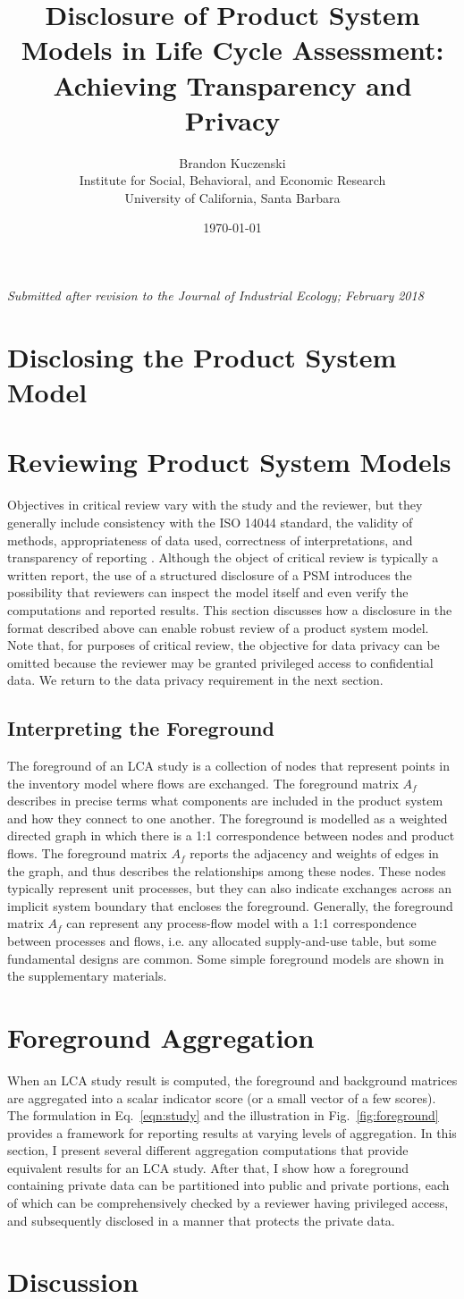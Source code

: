 \documentclass[12pt]{article}
\title{Disclosure of Product System Models in Life Cycle Assessment: Achieving Transparency and Privacy}
\author{Brandon Kuczenski\\
Institute for Social, Behavioral, and Economic Research\\
University of California, Santa Barbara}
\date{\mydate\today}
\def\mainpaper{

  \maketitle
  \emph{Submitted after revision to the Journal of Industrial Ecology; February 2018}

  

  \doublespacing


  
\section{Disclosing the Product System Model}

  
  


\section{Reviewing Product System Models}

Objectives in critical review vary with the study and the reviewer, but they generally include consistency with the ISO 14044 standard, the validity of methods, appropriateness of data used, correctness of interpretations, and transparency of reporting \citep[Section 6.1]{iso14044}.  Although the object of critical review is typically a written report, the use of a structured disclosure of a PSM introduces the possibility that reviewers can inspect the model itself and even verify the computations and reported results.  This section discusses how a disclosure in the format described above can enable robust review of a product system model.  Note that, for purposes of critical review, the objective for data privacy can be omitted because the reviewer may be granted privileged access to confidential data.  We return to the data privacy requirement in the next section.

\subsection{Interpreting the Foreground}

The foreground of an LCA study is a collection of nodes that represent points in the inventory model where flows are exchanged.  The foreground matrix $A_f$ describes in precise terms what components are included in the product system and how they connect to one another.  The foreground is modelled as a weighted directed graph in which there is a 1:1 correspondence between nodes and product flows.  The foreground matrix $A_f$ reports the adjacency and weights of edges in the graph, and thus describes the relationships among these nodes.  These nodes typically represent unit processes, but they can also indicate exchanges across an implicit system boundary that encloses the foreground.  Generally, the foreground matrix $A_f$ can represent any process-flow model with a 1:1 correspondence between processes and flows, i.e. any allocated supply-and-use table, but some fundamental designs are common.  Some simple foreground models are shown in the supplementary materials.


\section{Foreground Aggregation}

When an LCA study result is computed, the foreground and background matrices are aggregated into a scalar indicator score (or a small vector of a few scores).  The formulation in Eq.~\ref{eqn:study} and the illustration in Fig.~\ref{fig:foreground} provides a framework for reporting results at varying levels of aggregation.  In this section, I present several different aggregation computations that provide equivalent results for an LCA study.   After that, I show how a foreground containing private data can be partitioned into public and private portions, each of which can be comprehensively checked by a reviewer having privileged access, and subsequently disclosed in a manner that protects the private data.



\section{Discussion}



  
  
%  

%  
  
%  
  
%  

%  

 \singlespacing
 
}
\def\supporting{
  \setcounter{figure}{0}
  \setcounter{table}{0}
  \renewcommand{\thefigure}{S\arabic{figure}}
  \renewcommand{\thetable}{S\arabic{table}}

  \maketitle

  \begin{center}
    \Large Supporting Information
  \end{center}


  

  

    
  

  
  
%  

%  
  
%  
  
%  

  \singlespacing
}
\def\unused{
  
}
\begin{document}
\mainpaper

\end{document}
